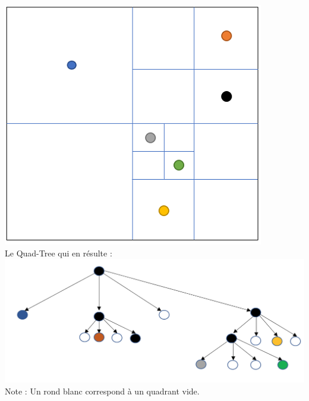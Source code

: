 \begin{Exercice}[10 minutes]
\begin{solution}
    \includegraphics[]{Solutions/Quad-Tree 3 solution 1.PNG}\\
    
    Le Quad-Tree qui en résulte :\\
    
    \includegraphics[]{Solutions/Quad-Tree 3 solution 2.1.png}\\
    
    Note : Un rond blanc correspond à un quadrant vide.
    
\end{solution}
\end{Exercice}


